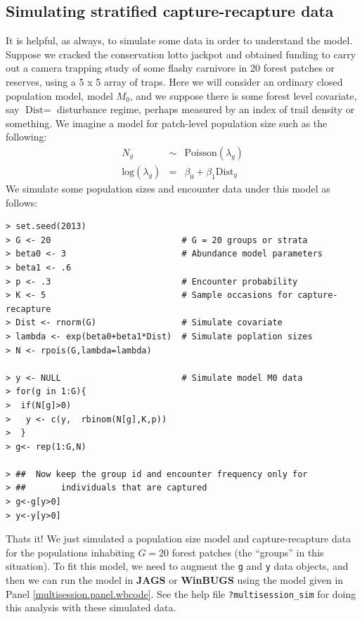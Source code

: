 \subsection{
Simulating stratified
capture-recapture data
}

It is helpful, as always, to simulate some data in order to understand
the model. Suppose we cracked the conservation lotto jackpot and obtained
funding to carry out a camera trapping study of some
 flashy
carnivore in 20 forest patches or reserves, using a 5 x 5 array of traps. Here we will
consider an ordinary closed population model, model $M_0$, and we
suppose there is
some forest level covariate, say $\mbox{Dist} = $ disturbance regime, perhaps measured by an
index of trail density or something.
We imagine a model for patch-level population size such as the following:
\begin{eqnarray*}
N_{g} &\sim& \mbox{Poisson}(\lambda_{g})  \\
\mbox{log}(\lambda_{g})& = &\beta_{0} + \beta_{1} \mbox{Dist}_{g}
\end{eqnarray*}
We simulate some population sizes and encounter data under this model
as follows:
\begin{verbatim}
> set.seed(2013)
> G <- 20                          # G = 20 groups or strata
> beta0 <- 3                       # Abundance model parameters
> beta1 <- .6
> p <- .3                          # Encounter probability
> K <- 5                           # Sample occasions for capture-recapture
> Dist <- rnorm(G)                 # Simulate covariate
> lambda <- exp(beta0+beta1*Dist)  # Simulate poplation sizes
> N <- rpois(G,lambda=lambda)

> y <- NULL                        # Simulate model M0 data
> for(g in 1:G){
>  if(N[g]>0)
>   y <- c(y,  rbinom(N[g],K,p))
>  }
> g<- rep(1:G,N)

> ##  Now keep the group id and encounter frequency only for
> ##       individuals that are captured
> g<-g[y>0]
> y<-y[y>0]
\end{verbatim}
Thats it!
We just simulated a population size model and
capture-recapture data for the populations inhabiting
 $G=20$ forest patches (the ``groups'' in this situation). To fit
this model, we need to augment the \mbox{\tt g} and \mbox{\tt y} data
objects, and then we can run the model in {\bf JAGS} or {\bf WinBUGS}
using the model given in Panel \ref{multisession.panel.wbcode}.
See the help file \mbox{\tt ?multisession\_sim}
for doing this analysis with these simulated data.


